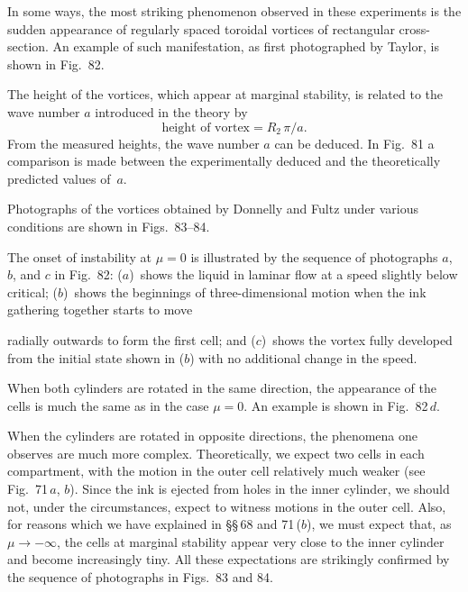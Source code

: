 In some ways, the most striking phenomenon observed in these
experiments is the sudden appearance of regularly spaced toroidal
vortices of rectangular cross-section.  An example of such manifestation,
as first photographed by Taylor, is shown in Fig.~82.

The height of the vortices, which appear at marginal stability, is
related to the wave number $a$ introduced in the theory by
\begin{equation}\label{eq:7-335}
\text{height of vortex} = R_2\,\pi/a.
\end{equation}
From the measured heights, the wave number $a$ can be deduced.  In
Fig.~81 a comparison is made between the experimentally deduced and
the theoretically predicted values of~$a$.


Photographs of the vortices obtained by Donnelly and Fultz under
various conditions are shown in Figs.~83--84.

The onset of instability at $\mu = 0$ is illustrated by the sequence of
photographs $a$, $b$, and $c$ in Fig.~82: ($a$)~shows the liquid in laminar flow
at a speed slightly below critical; ($b$)~shows the beginnings of three-dimensional
motion when the ink gathering together starts to move


\noindent radially outwards to form the first cell; and ($c$)~shows the vortex fully
developed from the initial state shown in ($b$) with no additional change
in the speed.

When both cylinders are rotated in the same direction, the appearance
of the cells is much the same as in the case $\mu = 0$.  An example is shown
in Fig.~82\,$d$.

When the cylinders are rotated in opposite directions, the phenomena
one observes are much more complex.  Theoretically, we expect two cells
in each compartment, with the motion in the outer cell relatively much
weaker (see Fig.~71\,$a$, $b$).  Since the ink is ejected from holes in the inner
cylinder, we should not, under the circumstances, expect to witness
motions in the outer cell.  Also, for reasons which we have explained in
\S\S\,68 and 71\,($b$), we must expect that, as $\mu \to -\infty$, the cells at marginal
stability appear very close to the inner cylinder and become increasingly
tiny.  All these expectations are strikingly confirmed by the sequence of
photographs in Figs.~83 and 84.

